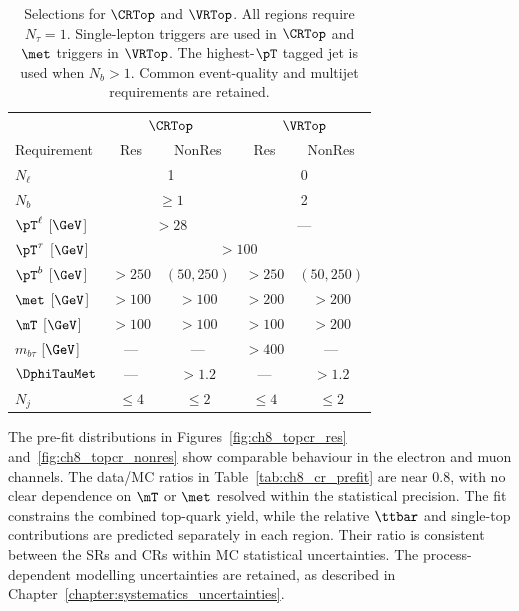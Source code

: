 \begin{table}[htbp]
    \centering
    \small
    \caption{Selections for $\CRTop$ and $\VRTop$. All regions require $N_\tau=1$. Single-lepton triggers are used in $\CRTop$ and $\met$ triggers in $\VRTop$. The highest-$\pT$ tagged jet is used when $N_b>1$. Common event-quality and multijet requirements are retained.}
    \label{tab:ch8_top_regions}
    \begin{tabular}{lcccc}
        \toprule
         & \multicolumn{2}{c}{$\CRTop$} & \multicolumn{2}{c}{$\VRTop$} \\
        Requirement & Res & NonRes & Res & NonRes \\
        \midrule
        $N_\ell$ & \multicolumn{2}{c}{1} & \multicolumn{2}{c}{0} \\
        $N_b$ & \multicolumn{2}{c}{$\geq1$} & \multicolumn{2}{c}{2} \\
        $\pT^\ell$ [$\GeV$] & \multicolumn{2}{c}{$>28$} & \multicolumn{2}{c}{---} \\
        $\pT^\tau$ [$\GeV$] & \multicolumn{4}{c}{$>100$} \\
        $\pT^b$ [$\GeV$] & $>250$ & $(50,250)$ & $>250$ & $(50,250)$ \\
        $\met$ [$\GeV$] & $>100$ & $>100$ & $>200$ & $>200$ \\
        $\mT$ [$\GeV$] & $>100$ & $>100$ & $>100$ & $>200$ \\
        $m_{b\tau}$ [$\GeV$] & --- & --- & $>400$ & --- \\
        $\DphiTauMet$ & --- & $>1.2$ & --- & $>1.2$ \\
        $N_j$ & $\leq4$ & $\leq2$ & $\leq4$ & $\leq2$ \\
        \bottomrule
    \end{tabular}
\end{table}

The pre-fit distributions in Figures~\ref{fig:ch8_topcr_res} and~\ref{fig:ch8_topcr_nonres} show comparable behaviour in the electron and muon channels.
The data/MC ratios in Table~\ref{tab:ch8_cr_prefit} are near 0.8, with no clear dependence on $\mT$ or $\met$ resolved within the statistical precision.
The fit constrains the combined top-quark yield, while the relative $\ttbar$ and single-top contributions are predicted separately in each region.
Their ratio is consistent between the SRs and CRs within MC statistical uncertainties.
The process-dependent modelling uncertainties are retained, as described in Chapter~\ref{chapter:systematics_uncertainties}.

